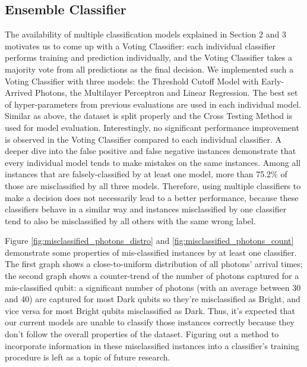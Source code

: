 \documentclass[letterpaper,twocolumn,10pt]{article}
\begin{document}
\subsection{Ensemble Classifier}

The availability of multiple classification models explained in Section 2 and 3 motivates us to come up with a Voting Classifier: each individual classifier performs training and prediction individually, and the Voting Classifier takes a majority vote from all predictions as the final decision. We implemented such a Voting Classifier with three models: the Threshold Cutoff Model with Early-Arrived Photons, the Multilayer Perceptron and Linear Regression. The best set of hyper-parameters from previous evaluations are used in each individual model. Similar as above, the dataset is split properly and the Cross Testing Method is used for model evaluation. Interestingly, no significant performance improvement is observed in the Voting Classifier compared to each individual classifier. A deeper dive into the false positive and false negative instances demonstrate that every individual model tends to make mistakes on the same instances. Among all instances that are falsely-classified by at least one model, more than 75.2\% of those are misclassified by all three models. Therefore, using multiple classifiers to make a decision does not necessarily lead to a better performance, because these classifiers behave in a similar way and instances misclassified by one classifier tend to also be misclassified by all others with the same wrong label.

Figure \ref{fig:misclassified_photons_distro} and \ref{fig:misclassified_photons_count} demonstrate some properties of mis-classified instances by at least one classifier. The first graph shows a close-to-uniform distribution of all photons' arrival times; the second graph shows a counter-trend of the number of photons captured for a mis-classified qubit: a significant number of photons (with an average between 30 and 40) are captured for most Dark qubits so they're misclassified as Bright, and vice versa for most Bright qubits misclassified as Dark. Thus, it's expected that our current models are unable to classify those instances correctly because they don't follow the overall properties of the dataset. Figuring out a method to incorporate information in these misclassified instances into a classifier's training procedure is left as a topic of future research.
\end{document}
